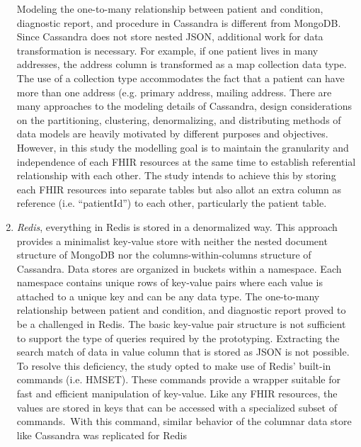 \documentclass[5p]{elsarticle}
\begin{document}
\begin{enumerate}
Modeling the one-to-many relationship between patient and condition, diagnostic report, and procedure in Cassandra is different from MongoDB. Since Cassandra does not store nested JSON, additional work for data transformation is necessary. For example, if one patient lives in many addresses, the address column is transformed as a map collection data type. The use of a collection type accommodates the fact that a patient can have more than one address (e.g. primary address, mailing address. 
There are many approaches to the modeling details of Cassandra, design considerations on the partitioning, clustering, denormalizing, and distributing methods of data models are heavily motivated by different purposes and objectives. However, in this study the modelling goal is to maintain the granularity and independence of each FHIR resources at the same time to establish referential relationship with each other. The study intends to achieve this by storing each FHIR resources into separate tables but also allot an extra column as reference (i.e. “patientId”) to each other, particularly the patient table.
\\
\item \emph{Redis}, everything in Redis is stored in a denormalized way. This approach provides a minimalist key-value store with neither the nested document structure of MongoDB nor the columns-within-columns structure of Cassandra. Data stores are organized in buckets within a namespace. Each namespace contains unique rows of key-value pairs where each value is attached to a unique key and can be any data type.
The one-to-many relationship between patient and condition, and diagnostic report proved to be a challenged in Redis. The basic key-value pair structure is not sufficient to support the type of queries required by the prototyping. Extracting the search match of data in value column that is stored as JSON is not possible. To resolve this deficiency, the study opted to make use of Redis’ built-in commands (i.e. HMSET). These commands provide a wrapper suitable for fast and efficient manipulation of key-value. Like any FHIR resources, the values are stored in keys that can be accessed with a specialized subset of commands. With this command, similar behavior of the columnar data store like Cassandra was replicated for Redis


\end{enumerate}
\end{document}
